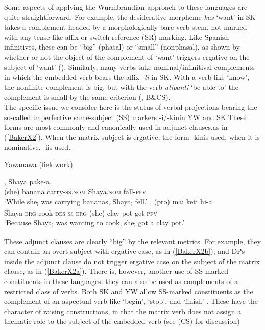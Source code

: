 \documentclass[output=paper,colorlinks,citecolor=brown,
]{langscibook}
\renewcommand{\sc}[1]{\textsc{#1}}
\begin{document}
Some aspects of applying the Wurmbrandian approach to these languages are quite straightforward. For example, the desiderative morpheme \textit{kas} `want’ in SK takes a complement headed by a morphologically bare verb stem, not marked with any tense-like affix or switch-reference (SR) marking. Like Spanish infinitives, these can be “big” (phasal) or “small” (nonphasal), as shown by whether or not the object of the complement of `want’ triggers ergative on the subject of `want’ (\citealt[371-376]{baker2014dependent}). Similarly, many verbs take nominal/infinitival complements in which the embedded verb bears the affix \textit{-ti} in SK. With a verb like `know’, the nonfinite complement is big, but with the verb \textit{atipanti} `be able to’ the complement is small by the same criterion (\citealt[17]{baker2020agree}, B\&CS).\\

The specific issue we consider here is the status of verbal projections bearing the so-called imperfective same-subject (SS) markers -i/-kinin YW and SK.These forms are most commonly and canonically used in adjunct clauses,as in (\ref{BakerX2}). When the matrix subject is ergative, the form -kinis used; when it is nominative, -iis used.

\begin{exe}
    \ex Yawanawa (fieldwork) \label{BakerX2}
	    \begin{xlist}
			\ex \label{BakerX2a}
			, Shaya pake-a.\\
			     (she) banana carry-\sc{ss.nom} Shaya.\sc{nom} fall-\sc{pfv}\\
			    \glt `While she\textsubscript{i} was carrying bananas, Shaya\textsubscript{i} fell.'
			\ex \label{BakerX2b}
			, (pro) mai  keti  hi-a.\\
    			 Shaya-\sc{erg} cook-\sc{des-ss-erg} (she) clay pot get-\sc{pfv}\\
			    \glt `Because Shaya\textsubscript{i} was wanting to cook, she\textsubscript{i} got a clay pot.'
		\end{xlist}
\end{exe}

These adjunct clauses are clearly “big” by the relevant metrics. For example, they can contain an overt subject with ergative case, as in (\ref{BakerX2b}), and DPs inside the adjunct clause do not trigger ergative case on the subject of the matrix clause, as in (\ref{BakerX2a}). There is, however, another use of SS-marked constituents in these languages: they can also be used as complements of a restricted class of verbs. Both SK and YW allow SS-marked constituents as the complement of an aspectual verb like ‘begin’, ‘stop’, and ‘finish’ \citep[319]{valenzuela2003transitivity}. These have the character of raising constructions, in that the matrix verb does not assign a thematic role to the subject of the embedded verb (see \citealt{camargosouza2020switch} (CS) for discussion)
\end{document}
